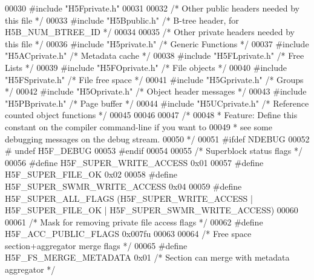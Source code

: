 \begin{DoxyCode}
00030 \textcolor{preprocessor}{#include "H5Fprivate.h"}
00031 
00032 \textcolor{comment}{/* Other public headers needed by this file */}
00033 \textcolor{preprocessor}{#include "H5Bpublic.h"}          \textcolor{comment}{/* B-tree header, for H5B\_NUM\_BTREE\_ID */}
00034 
00035 \textcolor{comment}{/* Other private headers needed by this file */}
00036 \textcolor{preprocessor}{#include "H5private.h"}      \textcolor{comment}{/* Generic Functions            */}
00037 \textcolor{preprocessor}{#include "H5ACprivate.h"}        \textcolor{comment}{/* Metadata cache                       */}
00038 \textcolor{preprocessor}{#include "H5FLprivate.h"}    \textcolor{comment}{/* Free Lists                           */}
00039 \textcolor{preprocessor}{#include "H5FOprivate.h"}        \textcolor{comment}{/* File objects                         */}
00040 \textcolor{preprocessor}{#include "H5FSprivate.h"}    \textcolor{comment}{/* File free space                      */}
00041 \textcolor{preprocessor}{#include "H5Gprivate.h"}     \textcolor{comment}{/* Groups               */}
00042 \textcolor{preprocessor}{#include "H5Oprivate.h"}         \textcolor{comment}{/* Object header messages               */}
00043 \textcolor{preprocessor}{#include "H5PBprivate.h"}        \textcolor{comment}{/* Page buffer                          */}
00044 \textcolor{preprocessor}{#include "H5UCprivate.h"}    \textcolor{comment}{/* Reference counted object functions   */}
00045 
00046 
00047 \textcolor{comment}{/*}
00048 \textcolor{comment}{ * Feature: Define this constant on the compiler command-line if you want to}
00049 \textcolor{comment}{ *      see some debugging messages on the debug stream.}
00050 \textcolor{comment}{ */}
00051 \textcolor{preprocessor}{#ifdef NDEBUG}
00052 \textcolor{preprocessor}{#  undef H5F\_DEBUG}
00053 \textcolor{preprocessor}{#endif}
00054 
00055 \textcolor{comment}{/* Superblock status flags */}
00056 \textcolor{preprocessor}{#define H5F\_SUPER\_WRITE\_ACCESS          0x01}
00057 \textcolor{preprocessor}{#define H5F\_SUPER\_FILE\_OK               0x02}
00058 \textcolor{preprocessor}{#define H5F\_SUPER\_SWMR\_WRITE\_ACCESS     0x04}
00059 \textcolor{preprocessor}{#define H5F\_SUPER\_ALL\_FLAGS             (H5F\_SUPER\_WRITE\_ACCESS | H5F\_SUPER\_FILE\_OK |
       H5F\_SUPER\_SWMR\_WRITE\_ACCESS)}
00060 
00061 \textcolor{comment}{/* Mask for removing private file access flags */}
00062 \textcolor{preprocessor}{#define H5F\_ACC\_PUBLIC\_FLAGS            0x007fu}
00063 
00064 \textcolor{comment}{/* Free space section+aggregator merge flags */}
00065 \textcolor{preprocessor}{#define H5F\_FS\_MERGE\_METADATA           0x01    }\textcolor{comment}{/* Section can merge with metadata aggregator */}\textcolor{preprocessor}{}

\end{DoxyCode}
